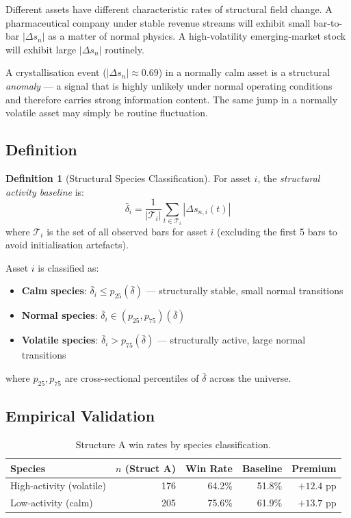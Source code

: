 \documentclass[11pt, a4paper]{article}
\newcommand{\dsn}{|\Delta s_n|}
\theoremstyle{definition}
\newtheorem{definition}{Definition}
\begin{document}
Different assets have different characteristic rates of structural field
change.
A pharmaceutical company under stable revenue streams will exhibit small
bar-to-bar $\dsn$ as a matter of normal physics.
A high-volatility emerging-market stock will exhibit large $\dsn$ routinely.

A crystallisation event ($\dsn \approx 0.69$) in a normally calm asset is
a structural \emph{anomaly} — a signal that is highly unlikely under normal
operating conditions and therefore carries strong information content.
The same jump in a normally volatile asset may simply be routine fluctuation.

\subsection{Definition}

\begin{definition}[Structural Species Classification]
\label{def:species}
For asset $i$, the \emph{structural activity baseline} is:
\[
  \bar{\delta}_i = \frac{1}{|\mathcal{T}_i|} \sum_{t \in \mathcal{T}_i} |\Delta s_{n,i}(t)|
\]
where $\mathcal{T}_i$ is the set of all observed bars for asset $i$
(excluding the first 5 bars to avoid initialisation artefacts).

Asset $i$ is classified as:
\begin{itemize}
  \item \textbf{Calm species}: $\bar{\delta}_i \leq p_{25}(\bar{\delta})$ — structurally stable, small normal transitions
  \item \textbf{Normal species}: $\bar{\delta}_i \in (p_{25}, p_{75})(\bar{\delta})$
  \item \textbf{Volatile species}: $\bar{\delta}_i > p_{75}(\bar{\delta})$ — structurally active, large normal transitions
\end{itemize}
where $p_{25}, p_{75}$ are cross-sectional percentiles of $\bar{\delta}$ across the universe.
\end{definition}

\subsection{Empirical Validation}

\begin{table}[h!]
\centering
\caption{Structure A win rates by species classification.}
\begin{tabular}{lrrrr}
\toprule
\textbf{Species} & \textbf{$n$ (Struct A)} & \textbf{Win Rate} & \textbf{Baseline} & \textbf{Premium} \\
\midrule
High-activity (volatile)  & 176 & 64.2\% & 51.8\% & $+12.4$ pp \\
Low-activity (calm)       & 205 & 75.6\% & 61.9\% & $+13.7$ pp \\
\bottomrule
\end{tabular}
\end{table}
\end{document}
